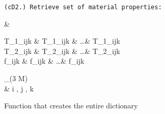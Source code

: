 \begin{algorithm}
    \texttt{(cD2.) Retrieve set of material properties: } 
    \begin{flalign*}
     & \gets
    \begin{bmatrix}
        T_{1_{ijk}} & T_{1_{ijk}} & \dots & T_{1_{ijk}} \\
        T_{2_{ijk}} & T_{2_{ijk}} & \dots & T_{2_{ijk}} \\
        \Delta f_{ijk} & \Delta f_{ijk} & \dots & \Delta f_{ijk} \\
    \end{bmatrix}_{(3 \times M)} \\
    &  i \in [1, N_{T_1}], j \in [1, N_{T_2}], k \in [1, N_{\Delta f}] 
    \end{flalign*}
    
    \fontsize{8pt}{8pt}\selectfont
    \caption{Function that creates the entire dictionary}
    \label{alg:createDictionary}
\end{algorithm}

